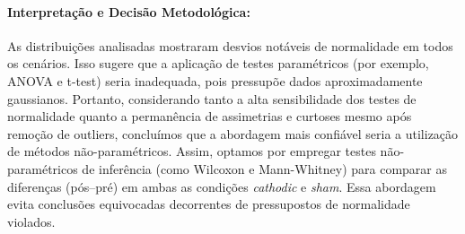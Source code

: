 \paragraph{Interpretação e Decisão Metodológica:}
As distribuições analisadas mostraram desvios notáveis de normalidade em todos os cenários. Isso sugere que a aplicação de testes paramétricos (por exemplo, ANOVA e t-test) seria inadequada, pois pressupõe dados aproximadamente gaussianos. 
Portanto, considerando tanto a alta sensibilidade dos testes de normalidade quanto a permanência de assimetrias e curtoses mesmo após remoção de outliers, concluímos que a abordagem mais confiável seria a utilização de métodos não-paramétricos.
Assim, optamos por empregar testes não-paramétricos de inferência (como Wilcoxon e Mann-Whitney) para comparar as diferenças (pós--pré) em ambas as condições \textit{cathodic} e \textit{sham}. Essa abordagem evita conclusões equivocadas decorrentes de pressupostos de normalidade violados.